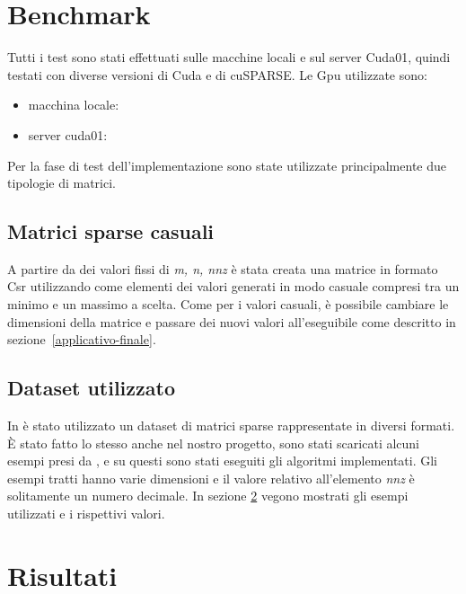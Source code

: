 \documentclass[]{IEEEtran}
\begin{document}
\section{Benchmark}
\label{benchmark}
	Tutti i test sono stati effettuati sulle macchine locali e sul server Cuda01, quindi testati con diverse versioni di Cuda e di cuSPARSE.\newline
	Le Gpu utilizzate sono:
	\begin{itemize}
		\item macchina locale:%
		\item server cuda01:
	\end{itemize}
	Per la fase di test dell'implementazione sono state utilizzate principalmente due tipologie di matrici.
	
	\subsection{Matrici sparse casuali}
	A partire da dei valori fissi di \textit{m, n, nnz} è stata creata una matrice in formato Csr utilizzando come elementi dei valori generati in modo casuale compresi tra un minimo e un massimo a scelta. Come per i valori casuali, è possibile cambiare le dimensioni della matrice e passare dei nuovi valori all'eseguibile come descritto in sezione~\ref{applicativo-finale}.
	
	\subsection{Dataset utilizzato}
	In \cite{parallelTrans} è stato utilizzato un dataset di matrici sparse rappresentate in diversi formati. È stato fatto lo stesso anche nel nostro progetto, sono stati scaricati alcuni esempi presi da \cite{dataset}, e su questi sono stati eseguiti gli algoritmi implementati. Gli esempi tratti hanno varie dimensioni e il valore relativo all'elemento \textit{nnz} è solitamente un numero decimale. In sezione \ref{risultati} vegono mostrati gli esempi utilizzati e i rispettivi valori.
	

\section{Risultati}
	\label{risultati}
	
	
\end{document}
